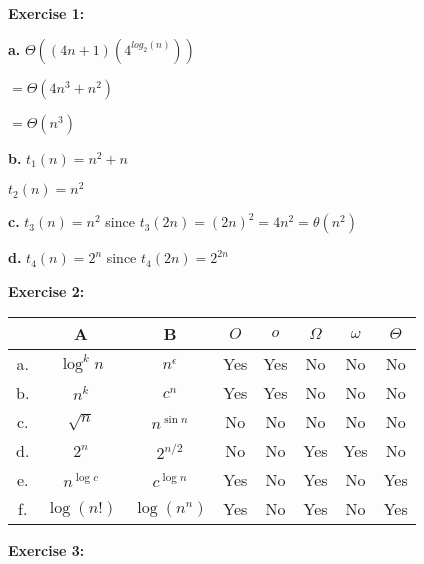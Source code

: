 \documentclass[12pt,letterpaper,final]{report}
\begin{document}
\vline


\noindent\textbf{Exercise 1:}  

\bigskip

\textbf{a.} $\Theta ((4n+1)(4^{log_2(n)}))$

\quad $= \Theta (4n^3+n^2)$

\quad $= \Theta (n^3)$

\bigskip

\textbf{b.} $t_1(n) = n^2 + n$

\quad $t_2(n) = n^2$

\bigskip

\textbf{c.} $t_3(n) = n^2$ since $t_3(2n) = (2n)^2 = 4n^2 = \theta (n^2)$

\bigskip

\textbf{d.}  $t_4(n) = 2^n$ since $t_4(2n) =  2^{2n}$

\bigskip

\noindent\textbf{Exercise 2:} 

\begin{table}[h]
\centering
\begin{tabular}{|c|c|c|c|c|c|c|c|}
\hline
& A & B & $O$ & $o$ & $\Omega$ & $\omega$ & $\Theta$ \\
\hline
a. & $\log^kn$ & $n^\epsilon$ & Yes & Yes & No & No & No  \\
\hline
b. & $n^k$ & $c^n$ & Yes & Yes & No & No & No  \\
\hline
c. & $\sqrt{n}$ & $n^{\sin n}$ & No & No & No & No & No  \\
\hline
d. & $2^n$ & $2^{n/2}$ & No & No & Yes & Yes & No  \\
\hline
e. & $n^{\log c}$ & $c^{\log n}$ & Yes & No & Yes & No & Yes  \\
\hline
f. & $\log(n!)$ & $\log(n^n)$ & Yes & No & Yes & No & Yes \\
\hline
\end{tabular}
\end{table}

\bigskip

\noindent\textbf{Exercise 3:}
\bigskip
\end{document}

